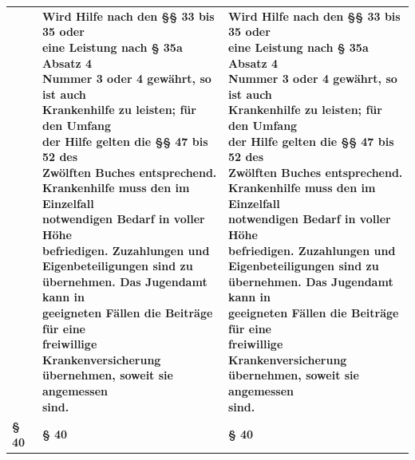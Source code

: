 \documentclass[10pt,a4paper,landscape]{article}
\begin{document}
\begin{longtable}{|L{8.2cm}|L{8.2cm}|L{8.2cm}|}
 & \textbf{Wird Hilfe nach den \S{}\S{} 33 bis 35 oder  \newline eine Leistung nach \S{} 35a Absatz 4  \newline Nummer 3 oder 4 gewährt, so ist auch  \newline Krankenhilfe zu leisten; für den Umfang  \newline der Hilfe gelten die \S{}\S{} 47 bis 52 des  \newline Zwölften Buches entsprechend.  \newline Krankenhilfe muss den im Einzelfall  \newline notwendigen Bedarf in voller Höhe  \newline befriedigen. Zuzahlungen und  \newline Eigenbeteiligungen sind zu  \newline übernehmen. Das Jugendamt kann in  \newline geeigneten Fällen die Beiträge für eine  \newline freiwillige Krankenversicherung  \newline übernehmen, soweit sie angemessen  \newline sind. } & \textbf{Wird Hilfe nach den \S{}\S{} 33 bis 35 oder  \newline eine Leistung nach \S{} 35a Absatz 4  \newline Nummer 3 oder 4 gewährt, so ist auch  \newline Krankenhilfe zu leisten; für den Umfang  \newline der Hilfe gelten die \S{}\S{} 47 bis 52 des  \newline Zwölften Buches entsprechend.  \newline Krankenhilfe muss den im Einzelfall  \newline notwendigen Bedarf in voller Höhe  \newline befriedigen. Zuzahlungen und  \newline Eigenbeteiligungen sind zu  \newline übernehmen. Das Jugendamt kann in  \newline geeigneten Fällen die Beiträge für eine  \newline freiwillige Krankenversicherung  \newline übernehmen, soweit sie angemessen  \newline sind. } \\
\hhline{|---|}
\textbf{\S{} 40} & \textbf{\S{} 40} & \textbf{\S{} 40} \\

\end{longtable}
\end{document}
